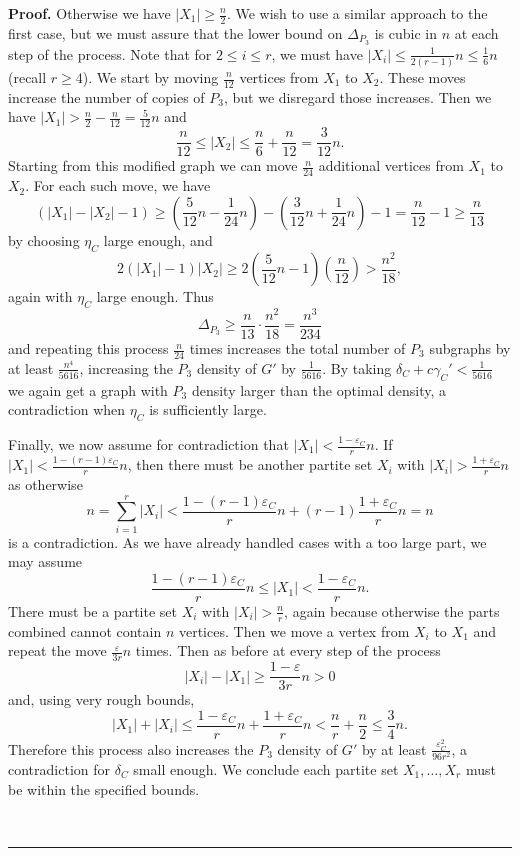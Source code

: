 \documentclass[12pt]{article}
\renewenvironment{proof}[1][Proof]{\textbf{#1.} }{\ \rule{0.5em}{0.5em}}
\begin{document}
\begin{proof}
Otherwise we have $|X_1| \ge \frac{n}{2}$. We wish to use a similar approach to
the first case, but we must assure that the lower bound on $\Delta_{P_3}$ is
cubic in $n$ at each step of the process. Note that for $2 \le i \le r$, we must have
$|X_i| \le \frac{1}{2(r-1)}n \le \frac{1}{6}n$ (recall $r \ge 4$). We start by
moving $\frac{n}{12}$ vertices from $X_1$ to $X_2$. These moves increase the
number of copies of $P_3$, but we disregard those increases. Then we have $|X_1|
> \frac{n}{2}-\frac{n}{12} = \frac{5}{12}n$ and
\[ \frac{n}{12} \le |X_2| \le \frac{n}{6} + \frac{n}{12} = \frac{3}{12}n. \]
Starting from this modified graph we can move $\frac{n}{24}$ additional
vertices from $X_1$ to $X_2$. For each such move, we have
\[ (|X_1|-|X_2|-1) \ge \left(\frac{5}{12}n-\frac{1}{24}n\right) -
\left(\frac{3}{12}n+\frac{1}{24}n\right) - 1 = \frac{n}{12} - 1 \ge \frac{n}{13} \]
by choosing $\eta_C$ large enough, and
\[ 2(|X_1|-1)|X_2| \ge 2\left(\frac{5}{12}n-1\right)\left(\frac{n}{12}\right) >
\frac{n^2}{18}, \]
again with $\eta_C$ large enough. Thus
\[ \Delta_{P_3} \ge \frac{n}{13}\cdot \frac{n^2}{18} = \frac{n^3}{234} \]
and repeating this process $\frac{n}{24}$ times increases the total number of
$P_3$ subgraphs by at least $\frac{n^4}{5616}$, increasing the $P_3$ density of $G'$ by
$\frac{1}{5616}$. By taking $\delta_C + c\gamma_C' < \frac{1}{5616}$ we again
get a graph with $P_3$ density larger than the optimal density, a contradiction
when $\eta_C$ is sufficiently large.

Finally, we now assume for contradiction that $|X_1| <
\frac{1-\varepsilon_C}{r}n$. If $|X_1| < \frac{1-(r-1)\varepsilon_C}{r}n$, then
there must be another partite set $X_i$ with $|X_i| > \frac{1+\varepsilon_C}{r}n$
as otherwise
\[ n = \sum_{i=1}^r |X_i| < \frac{1-(r-1)\varepsilon_C}{r}n +
(r-1)\frac{1+\varepsilon_C}{r}n = n\]
is a contradiction. As we have already handled cases with a too large part, we
may assume
\[ \frac{1-(r-1)\varepsilon_C}{r}n \le |X_1| < \frac{1-\varepsilon_C}{r}n. \]
There must be a partite set $X_i$ with $|X_i| > \frac{n}{r}$, again because
otherwise the parts combined cannot contain $n$ vertices. Then we move a vertex
from $X_i$ to $X_1$ and repeat the move $\frac{\varepsilon}{3r}n$ times. Then as
before at every step of the process
\[ |X_i|-|X_1| \ge \frac{1-\varepsilon}{3r}n > 0 \]
and, using very rough bounds,
\[ |X_1|+|X_i| \le \frac{1-\varepsilon_C}{r}n + \frac{1+\varepsilon_C}{r}n <
\frac{n}{r}+\frac{n}{2} \le \frac{3}{4}n. \]
Therefore this process also increases the $P_3$ density of $G'$ by at least
$\frac{\varepsilon_C^2}{96r^2}$, a contradiction for $\delta_C$ small enough. We
conclude each partite set $X_1, \ldots, X_r$ must be within the specified
bounds.


\end{proof}
\end{document}
